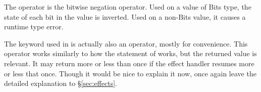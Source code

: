 \begin{prooftree}
\end{prooftree}

The operator \op{\textasciitilde} is the bitwise negation operator. Used on a value
of Bits type, the state of each bit in the value is inverted.
Used on a non-Bits value, it causes a runtime type error.

\begin{prooftree}
\end{prooftree}

The  keyword used in \Poetry{} is actually also an operator, mostly for
convenience. This operator works similarly to how the  statement of \Prose{}
works, but the returned value is relevant. It may return more or less than once if
the effect handler resumes more or less that once. Though it would be nice to explain
it now, once again leave the detailed explanation to \S\ref{sec:effects}.
